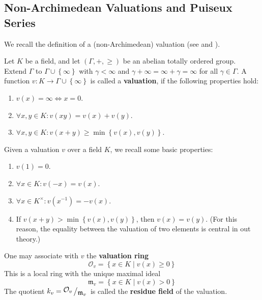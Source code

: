 \subsection{Non-Archimedean Valuations and Puiseux Series}

We recall the definition of a (non-Archimedean) valuation (see \cite{Efrat2006} and \cite{Tignol2015}).

\begin{defn}
Let $K$ be a field, and let $\left(\Gamma,+,\ge\right)$ be an abelian totally ordered group. Extend $\Gamma$ to $\Gamma\cup\left\{\infty\right\}$ with $\gamma<\infty$ and $\gamma+\infty=\infty+\gamma=\infty$ for all $\gamma\in\Gamma$. A function $v:K\to\Gamma\cup\left\{\infty\right\}$ is called a \textbf{valuation}, if the following properties hold:
\begin{enumerate}
  \item $v\left(x\right)=\infty\Longleftrightarrow x=0$.
  \item $\forall x,y\in K: v\left(xy\right)=v\left(x\right)+v\left(y\right)$.
  \item $\forall x,y\in K: v\left(x+y\right)\ge\min\left\{v\left(x\right), v\left(y\right)\right\}$.
\end{enumerate}
\end{defn}

Given a valuation $v$ over a field $K$, we recall some basic properties:
\begin{enumerate}
  \item $v\left(1\right)=0$.
  \item $\forall x\in K:v\left(-x\right)=v\left(x\right)$.
  \item $\forall x\in K^{\times}:v\left(x^{-1}\right)=-v\left(x\right)$.
  \item If $v\left(x+y\right)>\min\left\{v\left(x\right), v\left(y\right)\right\}$, then $v\left(x\right)=v\left(y\right)$. (For this reason, the equality between the valuation of two elements is central in out theory.)
\end{enumerate}

One may associate with $v$ the \textbf{valuation ring}
$$\mathcal{O}_v=\left\{x\in K\middle|v\left(x\right)\ge 0\right\}$$
This is a local ring with the unique maximal ideal
$$\mathfrak{m}_v=\left\{x\in K\middle|v\left(x\right)>0\right\}$$
The quotient $k_v=\quo{\mathcal{O}_v}{\mathfrak{m}_v}$ is called the \textbf{residue field} of the valuation.\\

